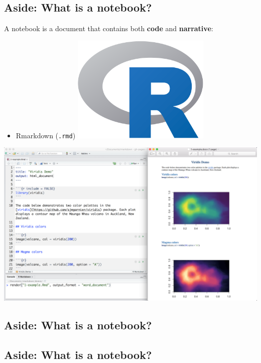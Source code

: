 \documentclass[
  letterpaper,
  DIV=11,
  numbers=noendperiod]{scrartcl}
\providecommand{\tightlist}{%
  \setlength{\itemsep}{0pt}\setlength{\parskip}{0pt}}\usepackage{longtable,booktabs,array}
\begin{document}
\subsection{Aside: What is a
notebook?}\label{aside-what-is-a-notebook-2}

A notebook is a document that contains both \textbf{code} and
\textbf{narrative}:

\begin{itemize}
\tightlist
\item
  Rmarkdown (\texttt{.rmd})
  \includegraphics[width=2.60417in,height=\textheight]{img/rlogo.png}
\end{itemize}

\includegraphics{img/rmarkdownexample.png}

\subsection{Aside: What is a
notebook?}\label{aside-what-is-a-notebook-3}

\subsection{Aside: What is a
notebook?}\label{aside-what-is-a-notebook-4}
\end{document}
